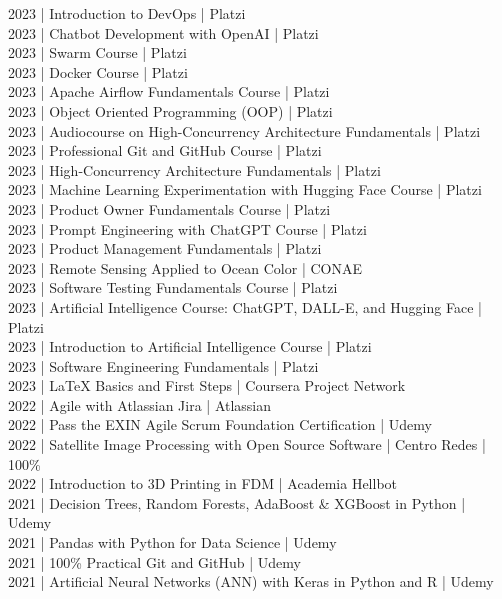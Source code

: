 {2023 | Introduction to DevOps | Platzi \\
2023 | Chatbot Development with OpenAI | Platzi \\
2023 | Swarm Course | Platzi \\
2023 | Docker Course | Platzi \\
2023 | Apache Airflow Fundamentals Course | Platzi \\
2023 | Object Oriented Programming (OOP) | Platzi \\
2023 | Audiocourse on High-Concurrency Architecture Fundamentals | Platzi \\
2023 | Professional Git and GitHub Course | Platzi \\
2023 | High-Concurrency Architecture Fundamentals | Platzi \\
2023 | Machine Learning Experimentation with Hugging Face Course | Platzi \\
2023 | Product Owner Fundamentals Course | Platzi \\
2023 | Prompt Engineering with ChatGPT Course | Platzi \\
2023 | Product Management Fundamentals | Platzi \\
2023 | Remote Sensing Applied to Ocean Color | CONAE \\
2023 | Software Testing Fundamentals Course | Platzi \\
2023 | Artificial Intelligence Course: ChatGPT, DALL-E, and Hugging Face | Platzi \\
2023 | Introduction to Artificial Intelligence Course | Platzi \\
2023 | Software Engineering Fundamentals | Platzi \\
2023 | LaTeX Basics and First Steps | Coursera Project Network \\
2022 | Agile with Atlassian Jira | Atlassian \\
2022 | Pass the EXIN Agile Scrum Foundation Certification | Udemy \\
2022 | Satellite Image Processing with Open Source Software | Centro Redes | 100\% \\
2022 | Introduction to 3D Printing in FDM | Academia Hellbot \\
2021 | Decision Trees, Random Forests, AdaBoost \& XGBoost in Python | Udemy \\
2021 | Pandas with Python for Data Science | Udemy \\
2021 | 100\% Practical Git and GitHub | Udemy \\
2021 | Artificial Neural Networks (ANN) with Keras in Python and R | Udemy \\
}
